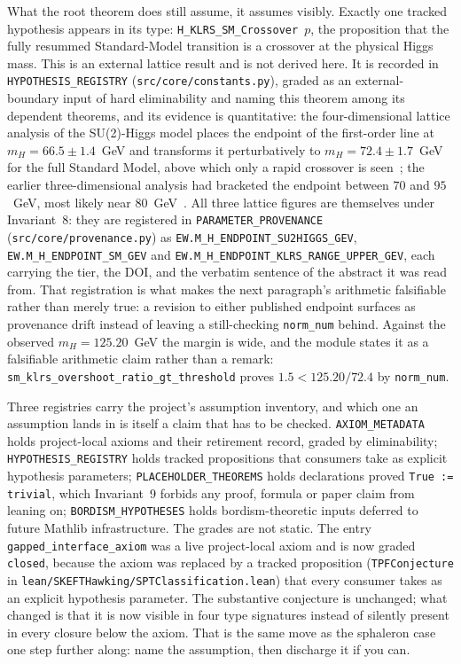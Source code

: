 \documentclass[11pt]{article}
\begin{document}
What the root theorem does still assume, it assumes visibly. Exactly
one tracked hypothesis appears in its type: \texttt{H\_KLRS\_SM\_Crossover}~$p$,
the proposition that the fully resummed Standard-Model transition is a
crossover at the physical Higgs mass. This is an external lattice
result and is not derived here. It is recorded in
\texttt{HYPOTHESIS\_REGISTRY} (\texttt{src/core/constants.py}), graded as
an external-boundary input of hard eliminability and naming this
theorem among its dependent theorems, and its evidence is quantitative:
the four-dimensional lattice analysis of the SU(2)-Higgs model places
the endpoint of the first-order line at $m_H = 66.5 \pm 1.4$~GeV and
transforms it perturbatively to $m_H = 72.4 \pm 1.7$~GeV for the full
Standard Model, above which only a rapid crossover is
seen~\cite{CsikorFodorHeitger1999}; the earlier three-dimensional
analysis had bracketed the endpoint between $70$ and $95$~GeV, most
likely near $80$~GeV~\cite{KLRS1996}. All three lattice figures are
themselves under Invariant~8: they are registered in
\texttt{PARAMETER\_PROVENANCE} (\texttt{src/core/provenance.py}) as
\texttt{EW.M\_H\_ENDPOINT\_SU2HIGGS\_GEV},
\texttt{EW.M\_H\_ENDPOINT\_SM\_GEV} and
\texttt{EW.M\_H\_ENDPOINT\_KLRS\_RANGE\_UPPER\_GEV}, each carrying the
tier, the DOI, and the verbatim sentence of the abstract it was read
from. That registration is what makes the next paragraph's arithmetic
falsifiable rather than merely true: a revision to either published
endpoint surfaces as provenance drift instead of leaving a
still-checking \texttt{norm\_num} behind. Against the observed $m_H =
125.20$~GeV the margin is wide, and the module states it as a
falsifiable arithmetic claim rather than a remark:
\texttt{sm\_klrs\_overshoot\_ratio\_gt\_threshold} proves
$1.5 < 125.20 / 72.4$ by \texttt{norm\_num}.

Three registries carry the project's assumption inventory, and which
one an assumption lands in is itself a claim that has to be checked.
\texttt{AXIOM\_METADATA} holds project-local axioms and their retirement
record, graded by eliminability; \texttt{HYPOTHESIS\_REGISTRY} holds
tracked propositions that consumers take as explicit hypothesis
parameters; \texttt{PLACEHOLDER\_THEOREMS} holds declarations proved
\texttt{True := trivial}, which Invariant~9 forbids any proof, formula
or paper claim from leaning on; \texttt{BORDISM\_HYPOTHESES} holds
bordism-theoretic inputs deferred to future Mathlib infrastructure. The
grades are not static. The entry \texttt{gapped\_interface\_axiom} was a
live project-local axiom and is now graded \texttt{closed}, because the
axiom was replaced by a tracked proposition (\texttt{TPFConjecture} in
\texttt{lean/SKEFTHawking/SPTClassification.lean}) that every consumer
takes as an explicit hypothesis parameter. The substantive conjecture is
unchanged; what changed is that it is now visible in four type
signatures instead of silently present in every closure below the
axiom. That is the same move as the sphaleron case one step further
along: name the assumption, then discharge it if you can.
\end{document}
